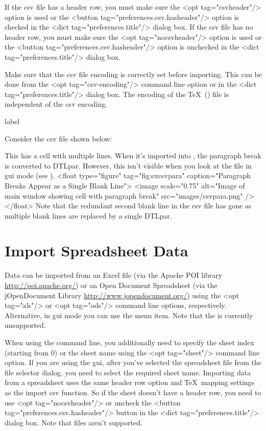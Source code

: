    If the \gls{csv} file has a header row, you must make sure 
   the <opt tag="csvheader"/> option is used or the 
   <button tag="preferences.csv.hasheader"/> option is checked in the
   <dict tag="preferences.title"/> dialog box.
   If the \gls{csv} file has no header row, you must make sure 
   the <opt tag="nocsvheader"/> option is used or the 
   <button tag="preferences.csv.hasheader"/> option is unchecked in the
   <dict tag="preferences.title"/> dialog box.


   Make sure that the \gls{csv} file encoding is correctly set
   before importing. This can be done from the <opt tag="csv-encoding"/>
   command line option or in the 
   <dict tag="preferences.title"/> dialog box. The encoding
   of the \TeX\ () file is independent of the \gls{csv}
   encoding.

\begin{example}{label}{}

   Consider the \gls{csv} file shown below:


   This has a cell with multiple lines. When it's imported into
   , the paragraph break is converted to \gls{DTLpar}.
   However, this isn't visible when you look at the file in 
   \gls{gui} mode (see ).
     <float type="figure" tag="fig:excsvpara" caption="Paragraph Breaks Appear as a Single Blank Line">
      <image scale="0.75" alt="Image of main window showing cell with paragraph break" src="images/csvpara.png" />
     </float>
   Note that the redundant second blank line in the \gls{csv} file
   has gone as multiple blank lines are replaced by a single
   \gls{DTLpar}.
\end{example}

\section{Import Spreadsheet Data}\label{sec:importspread}

   Data can be imported from an Excel  file (via the 
   Apache POI library \url{http://poi.apache.org/})
   or an Open Document Spreadsheet (via the jOpenDocument Library
   \url{http://www.jopendocument.org/}) using the
   <opt tag="xls"/> or <opt tag="ods"/> command line options, respectively.
   Alternative, in \gls{gui} mode you can use the 
    menu item.
   Note that the  is currently unsupported.

 When using the command line,
   you additionally need to specify the sheet index (starting from 0) or the 
   sheet name using the <opt tag="sheet"/> command line option. If you are 
   using the \gls{gui}, after you've selected the spreadsheet file 
   from the file selector dialog, you need to select the required sheet 
   name.
Importing data from a spreadsheet uses the same header row option and 
   \TeX\ mapping settings as the import \gls{csv} function. 
   So if the sheet doesn't have a header row, you need to use
   <opt tag="nocsvheader"/> or uncheck the <button tag="preferences.csv.hasheader"/> button 
   in the <dict tag="preferences.title"/> dialog box. Note that 
    files aren't supported.


